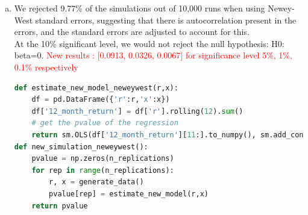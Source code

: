\begin{enumerate}[(a)]
\item 
We rejected 9.77\% of the simulations out of 10,000 runs when using Newey-West standard errors, suggesting that there is autocorrelation present in the errors, and the standard errors are adjusted to account for this.\\
At the 10\% significant level, we would not reject the null hypothesis: H0: beta=0. 
\textcolor{red}{New results : [0.0913, 0.0326, 0.0067] for significance level 5\%, 1\%, 0.1\% respectively}

\begin{lstlisting}[language=Python, caption=Python code for new model with Newey-West, label={lst:q1a}, escapechar=|, frame=single, basicstyle=\small, showstringspaces=false, captionpos=b, breaklines=true, showspaces=false, showtabs=false, keywordstyle=\color{blue}, commentstyle=\color{gray}]
    def estimate_new_model_neweywest(r,x):
    df = pd.DataFrame({'r':r,'x':x})
    df['12_month_return'] = df['r'].rolling(12).sum()
    # get the pvalue of the regression
    return sm.OLS(df['12_month_return'][11:].to_numpy(), sm.add_constant(df['x'][:-11]).to_numpy()).fit(cov_type='HAC', cov_kwds={'maxlags': 11}).pvalues[1]
def new_simulation_neweywest():
    pvalue = np.zeros(n_replications)
    for rep in range(n_replications):
        r, x = generate_data()
        pvalue[rep] = estimate_new_model(r,x)
    return pvalue
    \end{lstlisting}
\end{enumerate}


